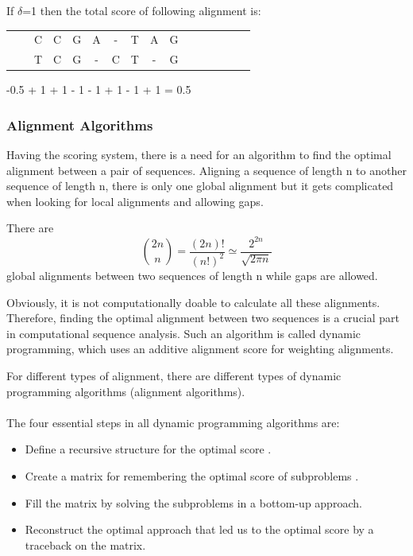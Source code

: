 \documentclass[11pt,a4paper]{report}
\begin{document}
If $\delta$=1 then the total score of following alignment is:
 
\begin{center}
	\begin{tabular}{c *{12}cccc}
        & & C & C & G & A & - & T & A & G && \\
 	  & & T  & C & G &  -  & C   &  T & -  & G & \\
    	                                 
	\end{tabular}
\end{center} 

-0.5 + 1 + 1 - 1 - 1 + 1 - 1 + 1 = 0.5




\subsubsection{Alignment Algorithms} \label{Alignment Algorithms}

Having the scoring system, there is a need for an algorithm to find
the optimal alignment between a pair of sequences. 
Aligning a sequence of length n to another sequence of length n,
there is only one global alignment but it gets complicated when 
looking for local alignments and allowing gaps.
 
There are \cite{durbin}
$$ \binom{2n}{n} = \frac{(2n)!}{(n!)^2} \simeq \frac{2^{2n}}
{\sqrt{2\pi n}} $$
global alignments between two sequences of length n while gaps 
are allowed.

Obviously, it is not computationally doable to calculate all these
alignments. Therefore, finding the optimal alignment between two 
sequences is a crucial part in computational sequence analysis.
Such an algorithm is called dynamic programming, which uses an 
additive alignment score for  weighting alignments. 

For different types of alignment, there are different 
types of dynamic programming algorithms (alignment algorithms).\\\\


The four essential steps in all dynamic programming algorithms are:

\begin{itemize} 
	\item Define a recursive structure for the optimal score
	\cite{eddydynamic}.
	\item  Create a  matrix for remembering the optimal score 
	of subproblems \cite{eddydynamic}.	
	\item Fill the matrix by solving the  subproblems in a 
	bottom-up approach\cite{eddydynamic}.
	\item Reconstruct the optimal approach that led us to the 
	optimal score by a traceback on the matrix\cite{eddydynamic}.
\end{itemize}
\end{document}
